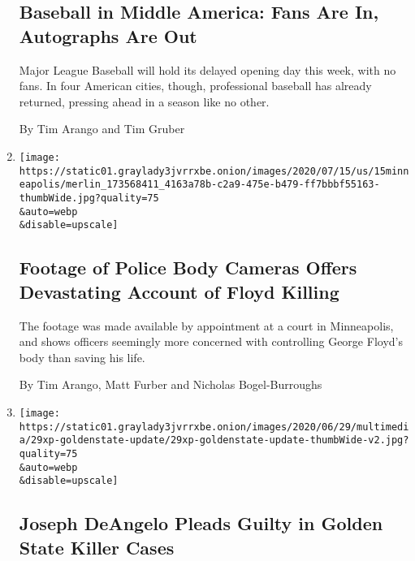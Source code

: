 \begin{enumerate}
  \hypertarget{baseball-in-middle-america-fans-are-in-autographs-are-out}{%
  \subsection{Baseball in Middle America: Fans Are In, Autographs Are
  Out}\label{baseball-in-middle-america-fans-are-in-autographs-are-out}}

  Major League Baseball will hold its delayed opening day this week,
  with no fans. In four American cities, though, professional baseball
  has already returned, pressing ahead in a season like no other.

  By Tim Arango and Tim Gruber
\item
  \href{/2020/07/15/us/george-floyd-video-killing.html}{}

  \texttt{[image: https://static01.graylady3jvrrxbe.onion/images/2020/07/15/us/15minneapolis/merlin\_173568411\_4163a78b-c2a9-475e-b479-ff7bbbf55163-thumbWide.jpg?quality=75\\\&auto=webp\\\&disable=upscale]}

  \hypertarget{footage-of-police-body-cameras-offers-devastating-account-of-floyd-killing}{%
  \subsection{Footage of Police Body Cameras Offers Devastating Account
  of Floyd
  Killing}\label{footage-of-police-body-cameras-offers-devastating-account-of-floyd-killing}}

  The footage was made available by appointment at a court in
  Minneapolis, and shows officers seemingly more concerned with
  controlling George Floyd's body than saving his life.

  By Tim Arango, Matt Furber and Nicholas Bogel-Burroughs
\item
  \href{/2020/06/29/us/golden-state-killer-joseph-deangelo.html}{}

  \texttt{[image: https://static01.graylady3jvrrxbe.onion/images/2020/06/29/multimedia/29xp-goldenstate-update/29xp-goldenstate-update-thumbWide-v2.jpg?quality=75\\\&auto=webp\\\&disable=upscale]}

  \hypertarget{joseph-deangelo-pleads-guilty-in-golden-state-killer-cases}{%
  \subsection{Joseph DeAngelo Pleads Guilty in Golden State Killer
  Cases}\label{joseph-deangelo-pleads-guilty-in-golden-state-killer-cases}}


\end{enumerate}
